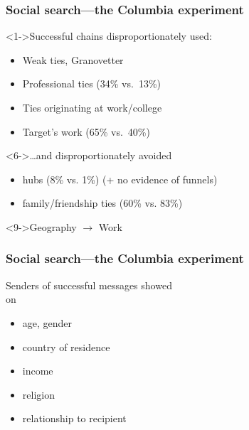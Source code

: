 \begin{frame}
  \frametitle{Social search---the Columbia experiment}

  \begin{block}<1->{Successful chains disproportionately used:}
    \begin{itemize}
    \item<2-> 
      Weak ties, Granovetter\cite{granovetter1973a}
    \item<3-> 
      Professional ties (34\% vs.\ 13\%)
    \item<4-> 
      Ties originating at work/college
    \item<5-> 
      Target's work (65\% vs.\ 40\%)
    \end{itemize}
  \end{block}
  
  \begin{block}<6->{\ldots and disproportionately avoided}
    \begin{itemize}
    \item<7-> 
      hubs (8\% vs. 1\%) (+ no evidence of funnels)
    \item<8->
      family/friendship ties (60\% vs. 83\%)
    \end{itemize}
  \end{block}

  \begin{block}<9->{Geography $\rightarrow$ Work}
  \end{block}  

\end{frame}


\begin{frame}
  \frametitle{Social search---the Columbia experiment}


  \begin{block}{}
  Senders of successful messages showed\\
   on
  \begin{itemize}
  \item<1->
    age, gender
  \item<2->
    country of residence
  \item<3-> 
    income
  \item<4-> 
    religion
  \item<5-> 
    relationship to recipient
  \end{itemize}

  \bigskip

  \end{block}

\end{frame}


